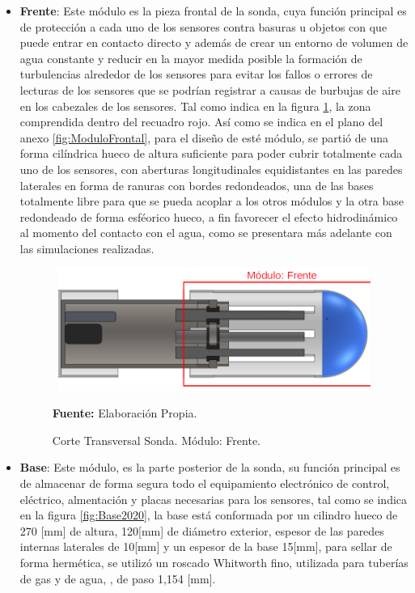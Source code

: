 \begin{itemize}
    \item \textbf{Frente}: Este m\'odulo es la pieza frontal de la sonda, cuya funci\'on principal es de protecci\'on a cada uno de los sensores contra basuras u objetos con que puede entrar en contacto directo y adem\'as de crear un entorno de volumen de agua constante y reducir en la mayor medida posible la formaci\'on de turbulencias alrededor de los sensores para evitar los fallos o errores de lecturas de los sensores que se podr\'ian registrar a causas de burbujas de aire en los cabezales de los sensores. Tal como indica en la figura \ref{fig:Frente}, la zona comprendida dentro del recuadro rojo. As\'i como se indica en el plano del anexo \ref{fig:ModuloFrontal}, para el dise\~no de est\'e m\'odulo, se parti\'o de una forma cil\'indrica hueco de altura suficiente para poder cubrir totalmente cada uno de los sensores, con aberturas longitudinales equidistantes en las paredes laterales en forma de ranuras con bordes redondeados, una de las bases totalmente libre para que se pueda acoplar a los otros m\'odulos y  la otra base redondeado de forma esf\'eorico hueco, a fin favorecer el efecto hidrodin\'amico al momento del contacto con el agua, como se presentara m\'as adelante con las simulaciones realizadas.
    
    \begin{figure}[ht]
        \centering
        \includegraphics[width=110mm, height=40mm]{Imagenes/cap3/CompletoV5_Frente.png}
        \caption[Corte Transversal]{Corte Transversal Sonda. M\'odulo: Frente.}\textbf{Fuente:} Elaboración Propia.
        \label{fig:Frente}
    \end{figure}
    \item \textbf{Base}: Este m\'odulo, es la parte posterior de la sonda, su función principal es de almacenar de forma segura todo el equipamiento electr\'onico de control, el\'ectrico, almentaci\'on y placas necesarias para los sensores, tal como se indica en la figura \ref{fig:Base2020}, la base est\'a conformada por un cilindro hueco de 270 [mm] de altura, 120[mm] de di\'ametro exterior, espesor de las paredes internas laterales de 10[mm] y un espesor de la base 15[mm],  para sellar de forma herm\'etica, se utilizó un roscado Whitworth fino, utilizada para tuber\'ias de gas y de agua, \cite{falk_metalotecnia_1986}, de paso 1,154 [mm].
    

\end{itemize}
